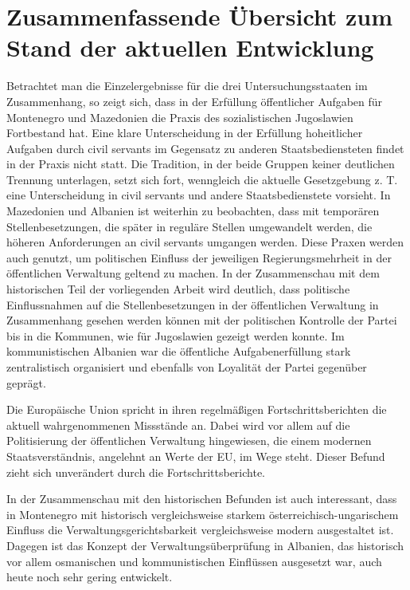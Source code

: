 \section{Zusammenfassende Übersicht zum Stand der aktuellen Entwicklung }

Betrachtet man die Einzelergebnisse für die drei Untersuchungsstaaten im Zusammenhang, so zeigt sich, dass in der Erfüllung öffentlicher Aufgaben für Montenegro und Mazedonien die Praxis des sozialistischen Jugoslawien Fortbestand hat. Eine klare Unterscheidung in der Erfüllung hoheitlicher Aufgaben durch civil servants im Gegensatz zu anderen Staatsbediensteten findet in der Praxis nicht statt. Die Tradition, in der beide Gruppen keiner deutlichen Trennung unterlagen, setzt sich fort, wenngleich die aktuelle Gesetzgebung z. T. eine Unterscheidung in civil servants und andere Staatsbedienstete vorsieht. In Mazedonien und Albanien ist weiterhin zu beobachten, dass mit temporären Stellenbesetzungen, die später in reguläre Stellen umgewandelt werden, die höheren Anforderungen an civil servants umgangen werden. Diese Praxen werden auch genutzt, um politischen Einfluss der jeweiligen Regierungsmehrheit in der öffentlichen Verwaltung geltend zu machen. In der Zusammenschau mit dem historischen Teil der vorliegenden Arbeit wird deutlich, dass politische Einflussnahmen auf die Stellenbesetzungen in der öffentlichen Verwaltung in Zusammenhang gesehen werden können mit der politischen Kontrolle der Partei bis in die Kommunen, wie für Jugoslawien gezeigt werden konnte. Im kommunistischen Albanien war die öffentliche Aufgabenerfüllung stark zentralistisch organisiert und ebenfalls von Loyalität der Partei gegenüber geprägt. \par
Die Europäische Union spricht in ihren regelmäßigen Fortschrittsberichten die aktuell wahrgenommenen Missstände an. Dabei wird vor allem auf die Politisierung der öffentlichen Verwaltung hingewiesen, die einem modernen Staatsverständnis, angelehnt an Werte der EU, im Wege steht. Dieser Befund zieht sich unverändert durch die Fortschrittsberichte.\par
In der Zusammenschau mit den historischen Befunden ist auch interessant, dass in Montenegro mit historisch vergleichsweise starkem österreichisch-ungarischem Einfluss die Verwaltungsgerichtsbarkeit vergleichsweise modern ausgestaltet ist. Dagegen ist das Konzept der Verwaltungsüberprüfung in Albanien, das historisch vor allem osmanischen und kommunistischen Einflüssen ausgesetzt war, auch heute noch sehr gering entwickelt.\par

